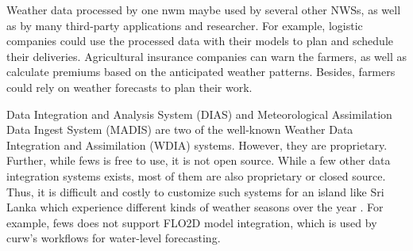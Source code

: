 Weather data processed by one \acrshort{nwm} maybe used by several other NWSs, as well as by many third-party applications and researcher. For example, logistic companies could use the processed data with their models to plan and schedule their deliveries. Agricultural insurance companies can warn the farmers, as well as calculate premiums based on the anticipated weather patterns. Besides, farmers could rely on weather forecasts to plan their work. %

Data Integration and Analysis System (DIAS) \cite{Kawasaki2018DataReduction} and Meteorological Assimilation Data Ingest System (MADIS) \cite{Macdermaid2005ArchitectureP2.39} are two of the well-known Weather Data Integration and Assimilation (WDIA) systems. However, they are proprietary. Further, while \acrfull{fews} \cite{Werner2013TheSystem} is free to use, it is not open source. While a few other data integration systems exists, most of them are also proprietary or closed source. Thus, it is difficult and costly to customize such systems for an island like Sri Lanka which experience different kinds of weather seasons over the year \cite{NaveendrakumarFiveLanka}. %
For example, \acrshort{fews} does not support FLO2D model integration, which is used by \acrshort{curw}'s workflows for water-level forecasting. %

